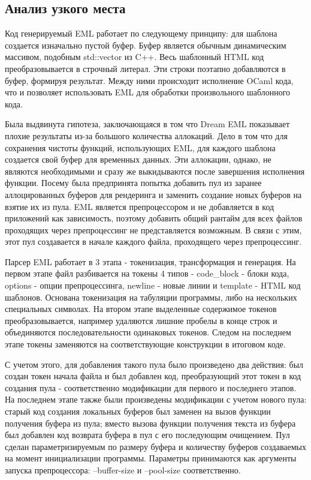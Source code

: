 \subsection{Анализ узкого места}

Код генерируемый EML работает по следующему принципу: для шаблона создается изначально пустой буфер.
Буфер является обычным динамическим массивом, подобным std::vector из C++.
Весь шаблонный HTML код преобразовывается в строчный литерал.
Эти строки поэтапно добавляются в буфер, формируя результат.
Между ними происходит исполнение OCaml кода, что и позволяет использовать EML для обработки произвольного шаблонного кода.

Была выдвинута гипотеза, заключающаяся в том что Dream EML показывает плохие результаты из-за большого количества аллокаций.
Дело в том что для сохранения чистоты функций, использующих EML, для каждого шаблона создается свой буфер для временных данных.
Эти аллокации, однако, не являются необходимыми и сразу же выкидываются после завершения исполнения функции.
Посему была предпринята попытка добавить пул из заранее аллоцированных буферов для рендеринга и заменить создание новых буферов на взятие их из пула.
EML является препроцессором и не добавляется в код приложений как зависимость, поэтому добавить общий рантайм для всех файлов проходящих через препроцессинг не представляется возможным.
В связи с этим, этот пул создавается в начале каждого файла, проходящего через препроцессинг.

Парсер EML работает в 3 этапа - токенизация, трансформация и генерация.
На первом этапе файл разбивается на токены 4 типов - code\_block - блоки кода, options - опции препроцессинга, newline - новые линии и template - HTML код шаблонов.
Основана токенизация на табуляции программы, либо на нескольких специальных символах.
На втором этапе выделенные содержимое токенов преобразовывается, например удаляются лишние пробелы в конце строк и объединяются последовательности одинаковых токенов.
Следом на последнем этапе токены заменяются на соответствующие конструкции в итоговом коде.

С учетом этого, для добавления такого пула было произведено два действия: был создан токен начала файла и был добавлен код, преобразующий этот токен в код создания пула - соответственно модификации для первого и последнего этапов.
На последнем этапе также были произведены модификации с учетом нового пула:
старый код создания локальных буферов был заменен на вызов функции получения буфера из пула;
вместо вызова функции получения текста из буфера был добавлен код возврата буфера в пул с его последующим очищением.
Пул сделан параметризируемым по размеру буфера и количеству буферов создаваемых на момент инициализации программы.
Параметры принимаются как аргументы запуска препроцессора: --buffer-size и --pool-size соответственно.

